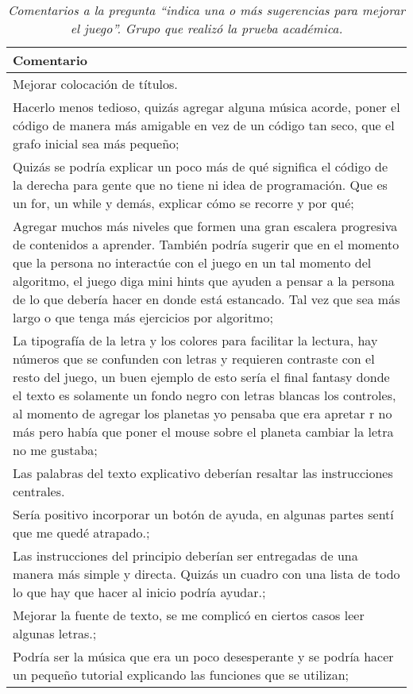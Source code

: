 \begin{table}[h]
   \centering
   \caption*{\textit{Comentarios a la pregunta ``indica una o más sugerencias para mejorar el juego''. Grupo que realizó la prueba académica.}}
   \begin{tabular}{|p{\linewidth}|}
   \hline
   \textbf{Comentario} \\\hline
   Mejorar colocación de títulos. \\ \hline
   Hacerlo menos tedioso, quizás agregar alguna música acorde, poner el código de manera más amigable en vez de un código tan seco, que el grafo inicial sea más pequeño; \\ \hline
   Quizás se podría explicar un poco más de qué significa el código de la derecha para gente que no tiene ni idea de programación. Que es un for, un while y demás, explicar cómo se recorre y por qué; \\ \hline
   Agregar muchos más niveles que formen una gran escalera progresiva de contenidos a aprender. También podría sugerir que en el momento que la persona no interactúe con el juego en un tal momento del algoritmo, el juego diga mini hints que ayuden a pensar a la persona de lo que debería hacer en donde está estancado. Tal vez que sea más largo o que tenga más ejercicios por algoritmo; \\ \hline
   La tipografía de la letra y los colores para facilitar la lectura, hay números que se confunden con letras y requieren contraste con el resto del juego, un buen ejemplo de esto sería el final fantasy donde el texto es solamente un fondo negro con letras blancas los controles, al momento de agregar los planetas yo pensaba que era apretar r no más pero había que poner el mouse sobre el planeta cambiar la letra no me gustaba; \\ \hline
   Las palabras del texto explicativo deberían resaltar las instrucciones centrales. \\ \hline
   Sería positivo incorporar un botón de ayuda, en algunas partes sentí que me quedé atrapado.; \\ \hline
   Las instrucciones del principio deberían ser entregadas de una manera más simple y directa. Quizás un cuadro con una lista de todo lo que hay que hacer al inicio podría ayudar.; \\ \hline
   Mejorar la fuente de texto, se me complicó en ciertos casos leer algunas letras.; \\ \hline
   Podría ser la música que era un poco desesperante y se podría hacer un pequeño tutorial explicando las funciones que se utilizan; \\ \hline

\end{tabular}
\end{table}

